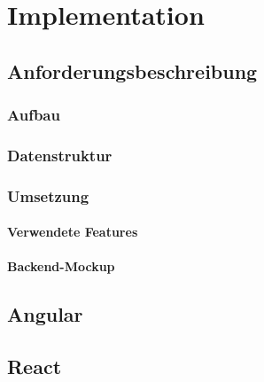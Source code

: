 \chapter{Implementation}

\section{Anforderungsbeschreibung}

\subsection{Aufbau}
\subsection{Datenstruktur}
\subsection{Umsetzung}
\subsubsection{Verwendete Features}
\subsubsection{Backend-Mockup}

\section{Angular}
\section{React}